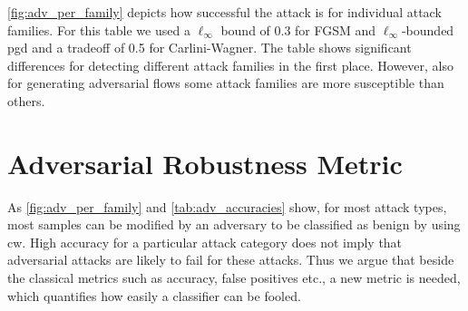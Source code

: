 \documentclass[conference]{IEEEtran}
\newcommand\note[2]{{\color{#1}#2}}
\newcommand\todo[1]{{\note{red}{TODO: #1}}}
\begin{document}
\autoref{fig:adv_per_family} depicts how successful the attack is for individual attack families. For this table we used a $\ell_\infty$ bound of 0.3 for FGSM and $\ell_\infty$-bounded \gls{pgd} and a tradeoff of 0.5 for Carlini-Wagner. The table shows significant differences for detecting different attack families in the first place. However, also for generating adversarial flows some attack families are more susceptible than others.


%
%


\section{Adversarial Robustness Metric}

As \autoref{fig:adv_per_family} and \autoref{tab:adv_accuracies} show, for most attack types, most samples can be modified by an adversary to be classified as benign by using \gls{cw}. High accuracy for a particular attack category does not imply that adversarial attacks are  likely to fail for these attacks. Thus we argue that beside the classical metrics such as accuracy, false positives etc., a new metric is needed, which quantifies how easily a classifier can be fooled. 
\end{document}
